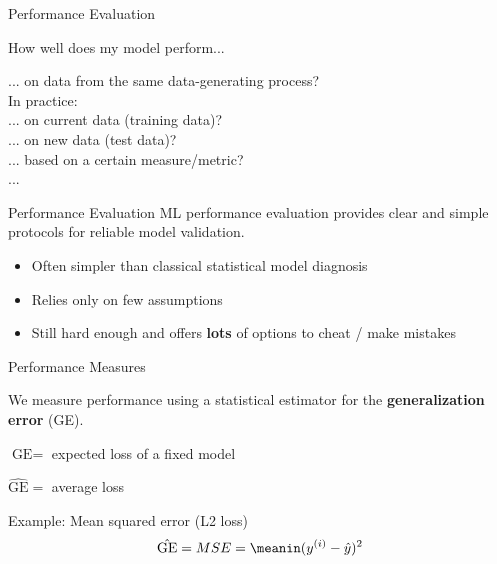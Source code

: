 \documentclass[11pt,compress,t,notes=noshow, xcolor=table]{beamer}
\begin{document}
\begin{vbframe}{Performance Evaluation}
\begin{center}
How well does my model perform...\\

\lz


\lz
... on data from the same data-generating process?\\
\lz
In practice:\\
\lz
... on current data (training data)?\\
... on new data (test data)?\\
... based on a certain measure/metric?\\
...

\end{center}
\end{vbframe}




\begin{vbframe}{Performance Evaluation}
ML performance evaluation provides clear and simple protocols for reliable model
validation. 

\begin{itemize}
\item Often simpler than classical statistical model diagnosis 
\item Relies only on few assumptions
\item Still hard enough and offers \textbf{lots} of options to cheat / make mistakes 
\end{itemize}
\end{vbframe}

\begin{vbframe}{Performance Measures}

We measure performance using a statistical estimator for the 
\textbf{generalization error} (GE).

\lz
$\text{GE} = $ expected loss of a fixed model

\lz
$\hat{\text{GE}} = $ average loss 

\lz \lz

Example: Mean squared error (L2 loss)
\[
\hat{\text{GE}} = MSE = \meanin (\yi - \yih)^2
\]

\end{vbframe}
\end{document}
